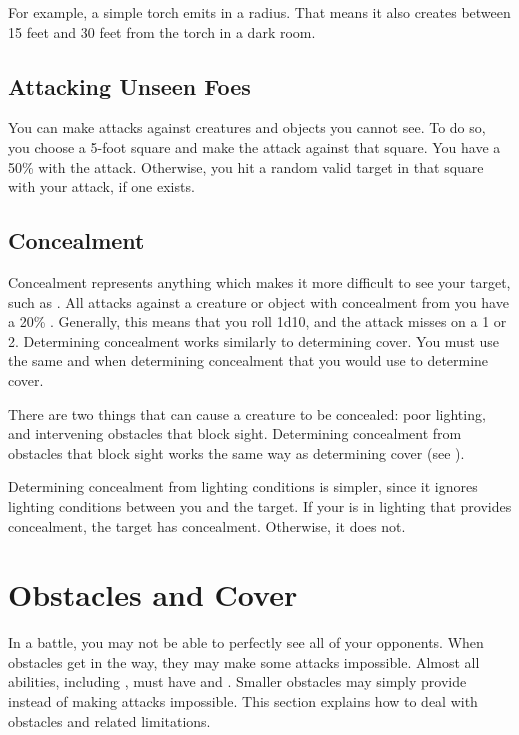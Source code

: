        For example, a simple torch emits  in a \smallarea radius.
        That means it also creates  between 15 feet and 30 feet from the torch in a dark room.

    \subsection{Attacking Unseen Foes}
        You can make  attacks against creatures and objects you cannot see.
        To do so, you choose a 5-foot square and make the attack against that square.
        You have a 50\%  with the attack.
        Otherwise, you hit a random valid target in that square with your attack, if one exists.

    \subsection{Concealment}\label{Concealment}
        Concealment represents anything which makes it more difficult to see your target, such as .
        All  attacks against a creature or object with concealment from you have a 20\% .
        Generally, this means that you roll 1d10, and the attack misses on a 1 or 2.
        Determining concealment works similarly to determining cover.
        You must use the same  and  when determining concealment that you would use to determine cover.

         There are two things that can cause a creature to be concealed: poor lighting, and intervening obstacles that block sight.
        Determining concealment from obstacles that block sight works the same way as determining cover (see ).

        Determining concealment from lighting conditions is simpler, since it ignores lighting conditions between you and the target.
        If your  is in lighting that provides concealment, the target has concealment.
        Otherwise, it does not.

\section{Obstacles and Cover}\label{Obstacles and Cover}
    In a battle, you may not be able to perfectly see all of your opponents.
    When obstacles get in the way, they may make some attacks impossible.
    Almost all abilities, including , must have  and .
    Smaller obstacles may simply provide  instead of making attacks impossible.
    This section explains how to deal with obstacles and related limitations.

